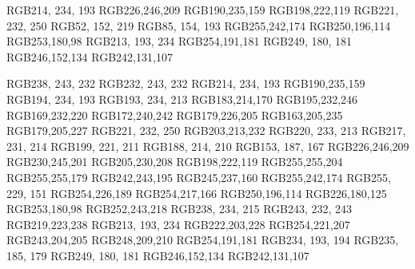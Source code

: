 \definecolor{tea_green}RGB{214, 234, 193}
\definecolor{hint_green}RGB{226,246,209}
\definecolor{Madang}RGB{190,235,159}
\definecolor{yellow_green}RGB{198,222,119}
\definecolor{link_water}RGB{221, 232, 250}
\definecolor{celestial_blue}RGB{52, 152, 219}
\definecolor{shakespeare}RGB{85, 154, 193}
\definecolor{buttermilk}RGB{255,242,174}
\definecolor{chardonnay}RGB{250,196,114}
\definecolor{rajah}RGB{253,180,98}
\definecolor{fog}RGB{213, 193, 234}
\definecolor{melon}RGB{254,191,181}
\definecolor{sundown}RGB{249, 180, 181}
\definecolor{mona_lisa}RGB{246,152,134}
\definecolor{salmon}RGB{242,131,107}


\definecolor{saltpan}RGB{238, 243, 232}
\definecolor{aqua_spring}RGB{232, 243, 232}
\definecolor{tea_green}RGB{214, 234, 193}
\definecolor{Madang}RGB{190,235,159}
\definecolor{fringy_flower}RGB{194, 234, 193}
\definecolor{aero_blue}RGB{193, 234, 213}
\definecolor{pixie_green}RGB{183,214,170}
\definecolor{french_pass}RGB{195,232,246}
\definecolor{ice_cold}RGB{169,232,220}
\definecolor{pale_turquoise}RGB{172,240,242}
\definecolor{cruise}RGB{179,226,205}
\definecolor{sail}RGB{163,205,235}
\definecolor{spindle}RGB{179,205,227}
\definecolor{link_water}RGB{221, 232, 250}
\definecolor{periwinkle}RGB{203,213,232}
\definecolor{zanah}RGB{220, 233, 213}
\definecolor{frostee}RGB{217, 231, 214}
\definecolor{opal}RGB{199, 221, 211}
\definecolor{jet_stream}RGB{188, 214, 210}
\definecolor{skeptic}RGB{153, 187, 167}
\definecolor{hint_green}RGB{226,246,209}
\definecolor{snow_flurry}RGB{230,245,201}
\definecolor{surf_crest}RGB{205,230,208}
\definecolor{yellow_green}RGB{198,222,119}
\definecolor{cream}RGB{255,255,204}
\definecolor{pale_prim}RGB{255,255,179}
\definecolor{spring_sun}RGB{242,243,195}
\definecolor{portafino}RGB{245,237,160}
\definecolor{buttermilk}RGB{255,242,174}
\definecolor{cream_brulee}RGB{255, 229, 151}
\definecolor{dairy_cream}RGB{254,226,189}
\definecolor{champagne}RGB{254,217,166}
\definecolor{chardonnay}RGB{250,196,114}
\definecolor{manhattan}RGB{226,180,125}
\definecolor{rajah}RGB{253,180,98}
\definecolor{early_dawn}RGB{252,243,218}
\definecolor{egg_shell}RGB{238, 234, 215}
\definecolor{selago}RGB{243, 232, 243}
\definecolor{quartz}RGB{219,223,238}
\definecolor{fog}RGB{213, 193, 234}
\definecolor{languid_lavender}RGB{222,203,228}
\definecolor{watusi}RGB{254,221,207}
\definecolor{coral_andy}RGB{243,204,205}
\definecolor{cosmos}RGB{248,209,210}
\definecolor{melon}RGB{254,191,181}
\definecolor{azalea}RGB{234, 193, 194}
\definecolor{beauty_bush}RGB{235, 185, 179}
\definecolor{sundown}RGB{249, 180, 181}
\definecolor{mona_lisa}RGB{246,152,134}
\definecolor{salmon}RGB{242,131,107}

